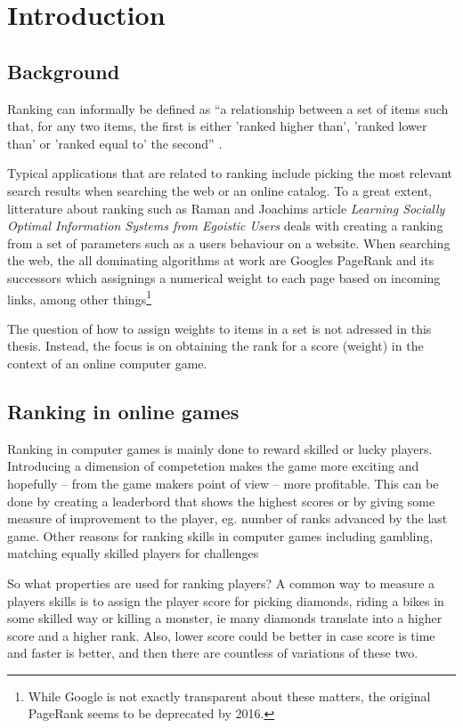\chapter{Introduction}

\section{Background}

Ranking can informally be defined as ``a relationship between a set of items such that, for any two items, the first is either 'ranked higher than', 'ranked lower than' or 'ranked equal to' the second'' \cite{wiki:ranking}.

Typical applications that are related to ranking include picking the most relevant search results when searching the web or an online catalog. To a great extent, litterature about ranking such as Raman and Joachims article \emph{Learning Socially Optimal Information Systems from Egoistic Users} \cite{raman} deals with creating a ranking from a set of parameters such as a users behaviour on a website. When searching the web, the all dominating algorithms at work are Googles PageRank and its successors which assignings a numerical weight to each page based on incoming links, among other things\footnote{While Google is not exactly transparent about these matters, the original PageRank seems to be deprecated by 2016.} 

The question of how to assign weights to items in a set is not adressed in this thesis. Instead, the focus is on obtaining the rank for a score (weight) in the context of an online computer game.   

\section{Ranking in online games}

Ranking in computer games is mainly done to reward skilled or lucky players. Introducing a dimension of competetion makes the game more exciting and hopefully -- from the game makers point of view -- more profitable. This can be done by creating a leaderbord that shows the highest scores or by giving some measure of improvement to the player, eg. number of ranks advanced by the last game. Other reasons for ranking skills in computer games including gambling, matching equally skilled players for challenges

So what properties are used for ranking players? A common way to measure a players skills is to assign the player score for picking diamonds, riding a bikes in some skilled way or killing a monster, ie many diamonds translate into a higher score and a higher rank. Also, lower score could be better in case score is time and faster is better, and then there are countless of variations of these two.

